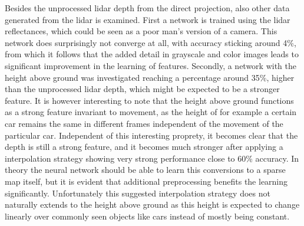 

Besides the unprocessed lidar depth from the direct projection, also other data generated from the lidar is examined. First a network is trained using the lidar reflectances, which could be seen as a poor man's version of a camera. This network does surprisingly not converge at all, with accuracy sticking around 4\%, from which it follows that the added detail in grayscale and color images leads to significant improvement in the learning of features. Secondly, a network with the height above ground was investigated reaching a percentage around 35\%, higher than the unprocessed lidar depth, which might be expected to be a stronger feature. It is however interesting to note that the height above ground functions as a strong feature invariant to movement, as the height of for example a certain car remains the same in different frames independent of the movement of the particular car. Independent of this interesting proprety, it becomes clear that the depth is still a strong feature, and it becomes much stronger after applying a interpolation strategy showing very strong performance close to 60\% accuracy. In theory the neural network should be able to learn this conversions to a sparse map itself, but it is evident that additional preprocessing benefits the learning significantly. Unfortunately this suggested interpolation strategy does not naturally extends to the height above ground as this height is expected to change linearly over commonly seen objects like cars instead of mostly being constant. 


